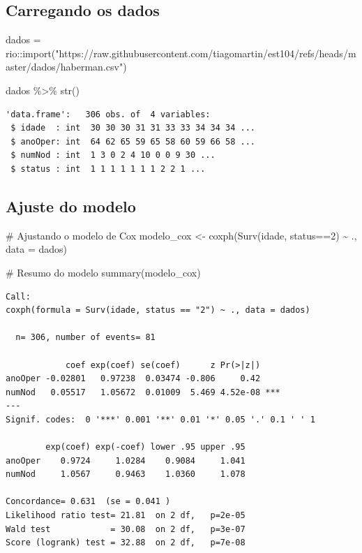 \documentclass[
  letterpaper,
  DIV=11,
  numbers=noendperiod]{scrartcl}
\newenvironment{Shaded}{\begin{snugshade}}{\end{snugshade}}
\newcommand{\AttributeTok}[1]{\textcolor[rgb]{0.40,0.45,0.13}{#1}}
\newcommand{\CommentTok}[1]{\textcolor[rgb]{0.37,0.37,0.37}{#1}}
\newcommand{\FunctionTok}[1]{\textcolor[rgb]{0.28,0.35,0.67}{#1}}
\newcommand{\NormalTok}[1]{\textcolor[rgb]{0.00,0.23,0.31}{#1}}
\newcommand{\OtherTok}[1]{\textcolor[rgb]{0.00,0.23,0.31}{#1}}
\newcommand{\SpecialCharTok}[1]{\textcolor[rgb]{0.37,0.37,0.37}{#1}}
\newcommand{\StringTok}[1]{\textcolor[rgb]{0.13,0.47,0.30}{#1}}
\begin{document}
\subsection{Carregando os dados}\label{carregando-os-dados-2}

\begin{Shaded}
\begin{Highlighting}[]
\NormalTok{dados }\OtherTok{=}\NormalTok{ rio}\SpecialCharTok{::}\FunctionTok{import}\NormalTok{(}\StringTok{"https://raw.githubusercontent.com/tiagomartin/est104/refs/heads/master/dados/haberman.csv"}\NormalTok{)}

\NormalTok{dados }\SpecialCharTok{\%\textgreater{}\%} 
  \FunctionTok{str}\NormalTok{()}
\end{Highlighting}
\end{Shaded}

\begin{verbatim}
'data.frame':   306 obs. of  4 variables:
 $ idade  : int  30 30 30 31 31 33 33 34 34 34 ...
 $ anoOper: int  64 62 65 59 65 58 60 59 66 58 ...
 $ numNod : int  1 3 0 2 4 10 0 0 9 30 ...
 $ status : int  1 1 1 1 1 1 1 2 2 1 ...
\end{verbatim}

\subsection{Ajuste do modelo}\label{ajuste-do-modelo-2}

\begin{Shaded}
\begin{Highlighting}[]
\CommentTok{\# Ajustando o modelo de Cox}
\NormalTok{modelo\_cox }\OtherTok{\textless{}{-}} \FunctionTok{coxph}\NormalTok{(}\FunctionTok{Surv}\NormalTok{(idade, status}\SpecialCharTok{==}\StringTok{\textquotesingle{}2\textquotesingle{}}\NormalTok{) }\SpecialCharTok{\textasciitilde{}}\NormalTok{ ., }\AttributeTok{data =}\NormalTok{ dados)}

\CommentTok{\# Resumo do modelo}
\FunctionTok{summary}\NormalTok{(modelo\_cox)}
\end{Highlighting}
\end{Shaded}

\begin{verbatim}
Call:
coxph(formula = Surv(idade, status == "2") ~ ., data = dados)

  n= 306, number of events= 81 

            coef exp(coef) se(coef)      z Pr(>|z|)    
anoOper -0.02801   0.97238  0.03474 -0.806     0.42    
numNod   0.05517   1.05672  0.01009  5.469 4.52e-08 ***
---
Signif. codes:  0 '***' 0.001 '**' 0.01 '*' 0.05 '.' 0.1 ' ' 1

        exp(coef) exp(-coef) lower .95 upper .95
anoOper    0.9724     1.0284    0.9084     1.041
numNod     1.0567     0.9463    1.0360     1.078

Concordance= 0.631  (se = 0.041 )
Likelihood ratio test= 21.81  on 2 df,   p=2e-05
Wald test            = 30.08  on 2 df,   p=3e-07
Score (logrank) test = 32.88  on 2 df,   p=7e-08
\end{verbatim}
\end{document}
